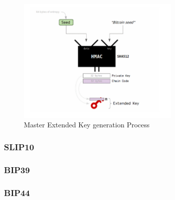\begin{figure}[ht!]
    \centering
    \includegraphics[width=0.7\textwidth]{images/masterbip32.png}
    \caption[Master Extended Key generation Process]{Master Extended Key generation Process}
    \label{fig:master_bip32}
\end{figure}

\subsubsection{SLIP10}
\label{SLIP10}

\subsubsection{BIP39}
\subsubsection{BIP44}

